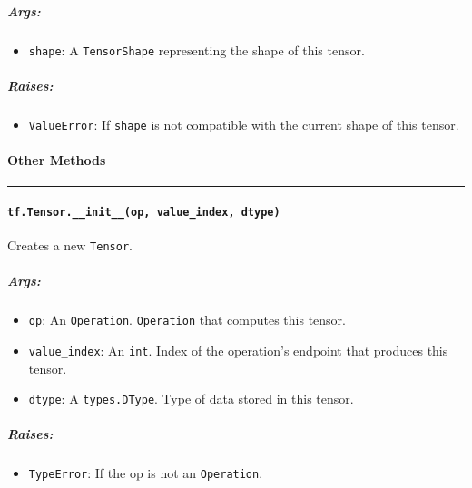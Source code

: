 \subparagraph{Args: }\label{args-16}

\begin{itemize}
\tightlist
\item
  \lstinline{shape}: A \lstinline{TensorShape} representing the shape of this
  tensor.
\end{itemize}

\subparagraph{Raises: }\label{raises-8}

\begin{itemize}
\tightlist
\item
  \lstinline{ValueError}: If \lstinline{shape} is not compatible with the
  current shape of this tensor.
\end{itemize}

\paragraph{Other Methods }\label{other-methods-1}

\begin{center}\rule{0.5\linewidth}{\linethickness}\end{center}

\paragraph{\texorpdfstring{\lstinline{tf.Tensor.__init__(op, value_index, dtype)}
}{tf.Tensor.__init__(op, value_index, dtype) }}\label{tf.tensor.ux5fux5finitux5fux5fop-valueux5findex-dtype}

Creates a new \lstinline{Tensor}.

\subparagraph{Args: }\label{args-17}

\begin{itemize}
\tightlist
\item
  \lstinline{op}: An \lstinline{Operation}. \lstinline{Operation} that computes
  this tensor.
\item
  \lstinline{value_index}: An \lstinline{int}. Index of the operation's
  endpoint that produces this tensor.
\item
  \lstinline{dtype}: A \lstinline{types.DType}. Type of data stored in this
  tensor.
\end{itemize}

\subparagraph{Raises: }\label{raises-9}

\begin{itemize}
\tightlist
\item
  \lstinline{TypeError}: If the op is not an \lstinline{Operation}.
\end{itemize}

